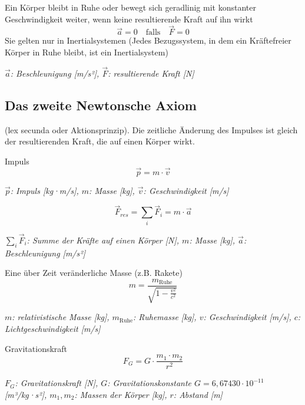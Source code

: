 \documentclass[a4paper,10pt]{article}
\newenvironment{displayformula}
{
	\begin{framed}
		\color{formulaColor}
	}
	{\end{framed}}
\newcommand{\formulalegend}[1]{%
	\par\vspace{0.5ex}%
	{{\color{legendColor}\RaggedRight\small\textit{#1}}}%
	\par\vspace{1.5ex}%
}
\begin{document}
\begin{displayformula}
	Ein Körper bleibt in Ruhe oder bewegt sich geradlinig mit konstanter Geschwindigkeit weiter, wenn keine resultierende Kraft auf ihn wirkt
	\[
	\vec{a} = 0 \quad \text{falls} \quad \vec{F} = 0
	\]
	Sie gelten nur in Inertialsystemen (Jedes Bezugssystem, in dem ein Kräftefreier Körper in Ruhe bleibt, ist ein Inertialsystem)
\end{displayformula}
\formulalegend{
	\( \vec{a} \): Beschleunigung [m/s²], \( \vec{F} \): resultierende Kraft [N]
}

\subsection{Das zweite Newtonsche Axiom}

\begin{displayformula}
	(lex secunda oder Aktionsprinzip). Die zeitliche Änderung des Impulses ist gleich der  
	resultierenden Kraft, die auf einen Körper wirkt.
\end{displayformula}

\begin{displayformula}
	Impuls
	\[
	\vec{p} = m \cdot \vec{v}
	\]
\end{displayformula}
\formulalegend{
	\( \vec{p} \): Impuls [kg·m/s], \( m \): Masse [kg], \( \vec{v} \): Geschwindigkeit [m/s]
}

\begin{displayformula}
	\[
	\vec{F}_{res} = \sum_{i} \vec{F}_i = m \cdot \vec{a}
	\]
\end{displayformula}
\formulalegend{
	\( \sum_{i} \vec{F}_i \): Summe der Kräfte auf einen Körper [N], \( m \): Masse [kg], \( \vec{a} \): Beschleunigung [m/s²]
}

\begin{displayformula}
	Eine über Zeit veränderliche Masse (z.B. Rakete)
	\[
	m = \frac{m_{\text{Ruhe}}}{\sqrt{1 - \frac{v^2}{c^2}}}
	\]
\end{displayformula}
\formulalegend{
	\( m \): relativistische Masse [kg], \( m_{\text{Ruhe}} \): Ruhemasse [kg], \( v \): Geschwindigkeit [m/s], \( c \): Lichtgeschwindigkeit [m/s]
}

\begin{displayformula}
	Gravitationskraft
	\[
	F_G = G \cdot \frac{m_1 \cdot m_2}{r^2}
	\]
\end{displayformula}
\formulalegend{
	\( F_G \): Gravitationskraft [N], \( G \): Gravitationskonstante $G = 6,67430 \cdot 10^{-11}$[m³/kg·s²], \( m_1, m_2 \): Massen der Körper [kg], \( r \): Abstand [m]
}
\end{document}
